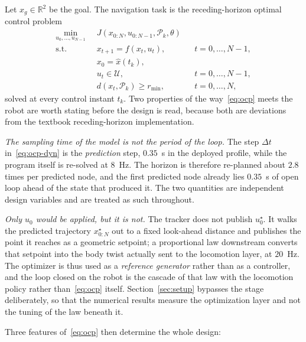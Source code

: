 \documentclass[11pt,a4paper]{article}
\newcommand{\R}{\mathbb{R}}
\begin{document}
Let $x_g\in\R^2$ be the goal. The navigation task is the receding-horizon optimal control problem
\begin{subequations}
\label{eq:ocp}
\begin{align}
  \min_{u_0,\dots,u_{N-1}}\;\; & J\!\left(x_{0:N},u_{0:N-1},\mathcal{P}_k,\theta\right) \label{eq:ocp-cost}\\
  \text{s.t.}\quad & x_{t+1}=f(x_t,u_t), && t=0,\dots,N-1, \label{eq:ocp-dyn}\\
                   & x_0 = \hat x(t_k), \label{eq:ocp-init}\\
                   & u_t\in\mathcal{U}, && t=0,\dots,N-1, \label{eq:ocp-input}\\
                   & d\!\left(x_t,\mathcal{P}_k\right)\ge r_{\min}, && t=0,\dots,N, \label{eq:ocp-obs}
\end{align}
\end{subequations}
solved at every control instant $t_k$. Two properties of the way~\eqref{eq:ocp} meets the robot are worth
stating before the design is read, because both are deviations from the textbook receding-horizon
implementation.

\emph{The sampling time of the model is not the period of the loop.} The step $\Delta t$
in~\eqref{eq:ocp-dyn} is the \emph{prediction} step, $0.35$~s in the deployed profile, while the program
itself is re-solved at $8$~Hz. The horizon is therefore re-planned about $2.8$ times per predicted node, and
the first predicted node already lies $0.35$~s of open loop ahead of the state that produced it. The two
quantities are independent design variables and are treated as such throughout.

\emph{Only $u_0$ would be applied, but it is not.} The tracker does not publish $u^\star_0$. It walks the
predicted trajectory $x^\star_{0:N}$ out to a fixed look-ahead distance and publishes the point it reaches as
a geometric setpoint; a proportional law downstream converts that setpoint into the body twist actually sent
to the locomotion layer, at $20$~Hz. The optimizer is thus used as a \emph{reference generator} rather than
as a controller, and the loop closed on the robot is the cascade of that law with the locomotion policy
rather than~\eqref{eq:ocp} itself. Section~\ref{sec:setup} bypasses the stage deliberately, so that the
numerical results measure the optimization layer and not the tuning of the law beneath it.

Three features of~\eqref{eq:ocp} then determine the whole design:
\end{document}
